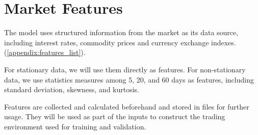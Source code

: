 \section{Market Features}
The model uses structured information from the market as its data source, including interest rates, commodity prices and currency exchange indexes. (\autoref{appendix:features_list}).
\par
For stationary data, we will use them directly as features. For non-stationary data, we use statistics measures among 5, 20, and 60 days as features, including standard deviation, skewness, and kurtosis.
\par
Features are collected and calculated beforehand and stored in files for further usage. They will be used as part of the inputs to construct the trading environment used for training and validation.